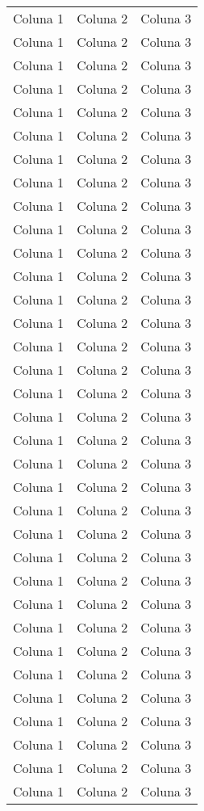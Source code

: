 \documentclass[a4paper,12pt]{article}
\begin{document}
\begin{longtable}[c]{ccc}
		Coluna 1 & Coluna 2 & Coluna 3 \\
		Coluna 1 & Coluna 2 & Coluna 3 \\
		Coluna 1 & Coluna 2 & Coluna 3 \\
		Coluna 1 & Coluna 2 & Coluna 3 \\
		Coluna 1 & Coluna 2 & Coluna 3 \\
		\midrule
		Coluna 1 & Coluna 2 & Coluna 3 \\
		Coluna 1 & Coluna 2 & Coluna 3 \\
		Coluna 1 & Coluna 2 & Coluna 3 \\
		Coluna 1 & Coluna 2 & Coluna 3 \\
		Coluna 1 & Coluna 2 & Coluna 3 \\
		\midrule
		Coluna 1 & Coluna 2 & Coluna 3 \\
		Coluna 1 & Coluna 2 & Coluna 3 \\
		Coluna 1 & Coluna 2 & Coluna 3 \\
		Coluna 1 & Coluna 2 & Coluna 3 \\
		Coluna 1 & Coluna 2 & Coluna 3 \\
		\midrule
		Coluna 1 & Coluna 2 & Coluna 3 \\
		Coluna 1 & Coluna 2 & Coluna 3 \\
		Coluna 1 & Coluna 2 & Coluna 3 \\
		Coluna 1 & Coluna 2 & Coluna 3 \\
		Coluna 1 & Coluna 2 & Coluna 3 \\
		\midrule
		Coluna 1 & Coluna 2 & Coluna 3 \\
		Coluna 1 & Coluna 2 & Coluna 3 \\
		Coluna 1 & Coluna 2 & Coluna 3 \\
		Coluna 1 & Coluna 2 & Coluna 3 \\
		Coluna 1 & Coluna 2 & Coluna 3 \\
		\midrule
		Coluna 1 & Coluna 2 & Coluna 3 \\
		Coluna 1 & Coluna 2 & Coluna 3 \\
		Coluna 1 & Coluna 2 & Coluna 3 \\
		Coluna 1 & Coluna 2 & Coluna 3 \\
		Coluna 1 & Coluna 2 & Coluna 3 \\
		\midrule
		Coluna 1 & Coluna 2 & Coluna 3 \\
		Coluna 1 & Coluna 2 & Coluna 3 \\
		Coluna 1 & Coluna 2 & Coluna 3 \\
		Coluna 1 & Coluna 2 & Coluna 3 \\

\end{longtable}
\end{document}
